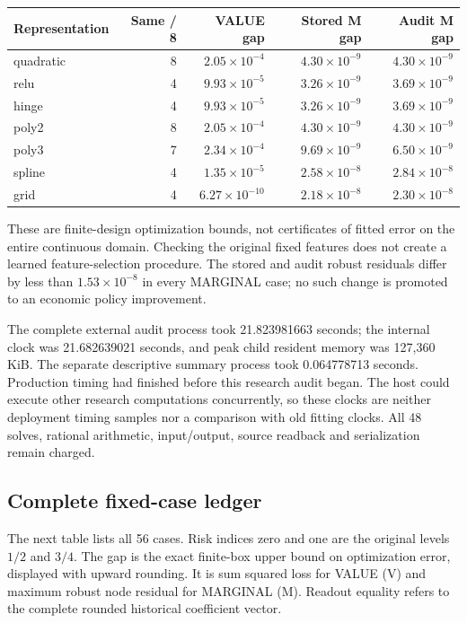 \begin{center}\small

\begin{tabular}{lrrrr}
\hline
Representation & Same / 8 & VALUE gap & Stored M gap & Audit M gap \\
\hline
quadratic & 8 & $2.05\times10^{-4}$ & $4.30\times10^{-9}$ & $4.30\times10^{-9}$ \\
relu & 4 & $9.93\times10^{-5}$ & $3.26\times10^{-9}$ & $3.69\times10^{-9}$ \\
hinge & 4 & $9.93\times10^{-5}$ & $3.26\times10^{-9}$ & $3.69\times10^{-9}$ \\
poly2 & 8 & $2.05\times10^{-4}$ & $4.30\times10^{-9}$ & $4.30\times10^{-9}$ \\
poly3 & 7 & $2.34\times10^{-4}$ & $9.69\times10^{-9}$ & $6.50\times10^{-9}$ \\
spline & 4 & $1.35\times10^{-5}$ & $2.58\times10^{-8}$ & $2.84\times10^{-8}$ \\
grid & 4 & $6.27\times10^{-10}$ & $2.18\times10^{-8}$ & $2.30\times10^{-8}$ \\
\hline
\end{tabular}

\end{center}

These are finite-design optimization bounds, not certificates of fitted error on the entire continuous domain. Checking the original fixed features does not create a learned feature-selection procedure. The stored and audit robust residuals differ by less than $1.53\times10^{-8}$ in every MARGINAL case; no such change is promoted to an economic policy improvement.

The complete external audit process took 21.823981663 seconds; the internal clock was 21.682639021 seconds, and peak child resident memory was 127,360 KiB. The separate descriptive summary process took 0.064778713 seconds. Production timing had finished before this research audit began. The host could execute other research computations concurrently, so these clocks are neither deployment timing samples nor a comparison with old fitting clocks. All 48 solves, rational arithmetic, input/output, source readback and serialization remain charged.

\subsection{Complete fixed-case ledger}

The next table lists all 56 cases. Risk indices zero and one are the original levels $1/2$ and $3/4$. The gap is the exact finite-box upper bound on optimization error, displayed with upward rounding. It is sum squared loss for VALUE (V) and maximum robust node residual for MARGINAL (M). Readout equality refers to the complete rounded historical coefficient vector.

